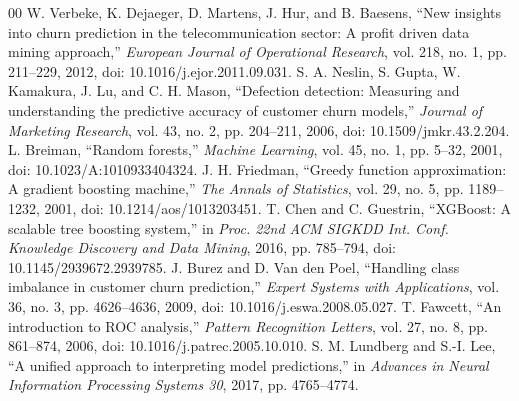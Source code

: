 \documentclass[conference]{IEEEtran}
\begin{document}
\begin{thebibliography}{00}
 W. Verbeke, K. Dejaeger, D. Martens, J. Hur, and B. Baesens, ``New insights into churn prediction in the telecommunication sector: A profit driven data mining approach,'' \emph{European Journal of Operational Research}, vol. 218, no. 1, pp. 211--229, 2012, doi: 10.1016/j.ejor.2011.09.031.
 S. A. Neslin, S. Gupta, W. Kamakura, J. Lu, and C. H. Mason, ``Defection detection: Measuring and understanding the predictive accuracy of customer churn models,'' \emph{Journal of Marketing Research}, vol. 43, no. 2, pp. 204--211, 2006, doi: 10.1509/jmkr.43.2.204.
 L. Breiman, ``Random forests,'' \emph{Machine Learning}, vol. 45, no. 1, pp. 5--32, 2001, doi: 10.1023/A:1010933404324.
 J. H. Friedman, ``Greedy function approximation: A gradient boosting machine,'' \emph{The Annals of Statistics}, vol. 29, no. 5, pp. 1189--1232, 2001, doi: 10.1214/aos/1013203451.
 T. Chen and C. Guestrin, ``XGBoost: A scalable tree boosting system,'' in \emph{Proc. 22nd ACM SIGKDD Int. Conf. Knowledge Discovery and Data Mining}, 2016, pp. 785--794, doi: 10.1145/2939672.2939785.
 J. Burez and D. Van den Poel, ``Handling class imbalance in customer churn prediction,'' \emph{Expert Systems with Applications}, vol. 36, no. 3, pp. 4626--4636, 2009, doi: 10.1016/j.eswa.2008.05.027.
 T. Fawcett, ``An introduction to ROC analysis,'' \emph{Pattern Recognition Letters}, vol. 27, no. 8, pp. 861--874, 2006, doi: 10.1016/j.patrec.2005.10.010.
 S. M. Lundberg and S.-I. Lee, ``A unified approach to interpreting model predictions,'' in \emph{Advances in Neural Information Processing Systems 30}, 2017, pp. 4765--4774.
\end{thebibliography}
\end{document}
